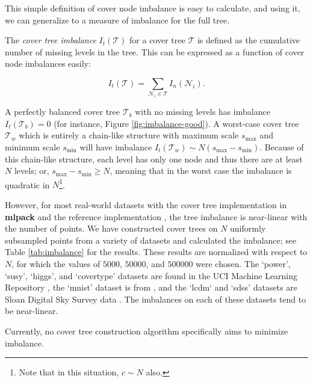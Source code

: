 This simple definition of cover node imbalance is easy to calculate, and using
it, we can generalize to a measure of imbalance for the full tree.

\begin{defn}
\label{def:imbalance}
The {\it cover tree imbalance} $I_t(\mathscr{T})$ for a cover tree $\mathscr{T}$
is defined as the cumulative number of missing levels in the tree.  This can be
expressed as a function of cover node imbalances easily:

\begin{equation}
I_t(\mathscr{T}) = \sum_{\mathscr{N}_i \in \mathscr{T}} I_n(\mathscr{N}_i).
\end{equation}
\end{defn}

A perfectly balanced cover tree $\mathscr{T}_b$ with no missing levels has
imbalance $I_t(\mathscr{T}_b) = 0$ (for instance, Figure
\ref{fig:imbalance-good}).  A worst-case cover tree $\mathscr{T}_w$ which is
entirely a chain-like structure with maximum scale $s_{\max}$ and minimum scale
$s_{\min}$ will have imbalance $I_t(\mathscr{T}_w) \sim N (s_{\max} -
s_{\min})$.  Because of this chain-like structure, each level has only one node
and thus there are at least $N$ levels; or, $s_{\max} - s_{\min} \ge N$, meaning
that in the worst case the imbalance is quadratic in $N$\footnote{Note that in
this situation, $c \sim N$ also.}.

However, for most real-world datasets with the cover tree implementation in {\bf
mlpack} \citep{mlpack2013} and the reference implementation
\citep{langford2006}, the tree imbalance is near-linear with the number of
points.  We have constructed cover trees on $N$ uniformly subsampled points
from a variety of datasets and calculated the imbalance; see Table
\ref{tab:imbalance} for the results.  These results are normalized with respect
to $N$, for which the values of $5000$, $50000$, and $500000$ were chosen.
The `power', `susy', `higgs', and `covertype' datasets are found in the UCI
Machine Learning Repository \cite{ucimlrepository}, the `mnist' dataset is from
\cite{lecun2000mnist}, and the `lcdm` and `sdss' datasets are Sloan Digital Sky
Survey data \cite{adelman2008sixth}.  The imbalances on each of these datasets
tend to be near-linear.

Currently, no cover tree construction algorithm specifically aims to minimize
imbalance.

